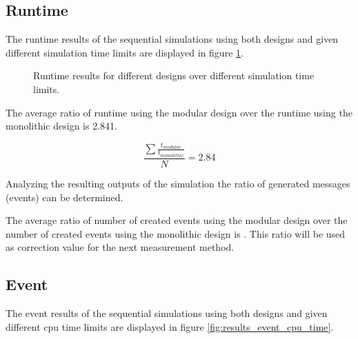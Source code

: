 \subsection{Runtime}
\label{sec:measurements_sequential_runtime}

The runtime results of the sequential simulations using both designs and given different simulation time limits are displayed in figure \ref{fig:results_runtime_sim_time}.

\begin{figure}
    \centering
    \caption{Runtime results for different designs over different simulation time limits.}
    \label{fig:results_runtime_sim_time}
\end{figure}

The average ratio of runtime using the modular design over the runtime using the monolithic design is 2.841.

\[\frac{\sum\frac{t_{modular}}{t_{monolithic}}}{N} = 2.84\]

Analyzing the resulting outputs of the simulation the ratio of generated messages (events) can be determined.


The average ratio of number of created events using the modular design over the number of created events using the monolithic design is .%
This ratio will be used as correction value for the next measurement method.

\subsection{Event}
\label{sec:measurements_sequential_event}

The event results of the sequential simulations using both designs and given different cpu time limits are displayed in figure \ref{fig:results_event_cpu_time}.


